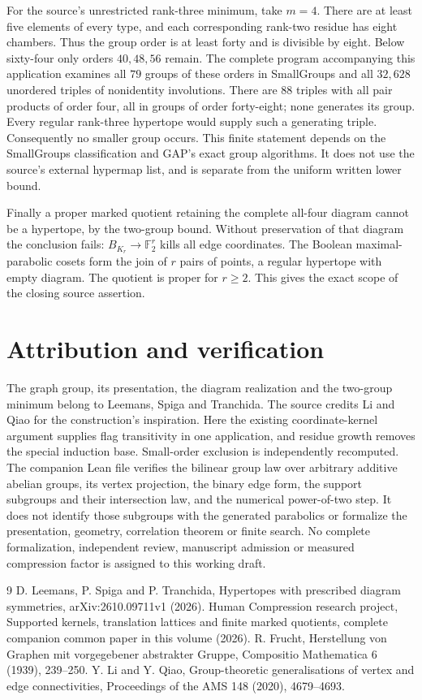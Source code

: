\documentclass[11pt,a4paper]{article}
\newcommand{\F}{\mathbb F_2}
\begin{document}
For the source's unrestricted rank-three minimum, take $m=4$. There are
at least five elements of every type, and each corresponding rank-two
residue has eight chambers. Thus the group order is at least forty and
is divisible by eight. Below sixty-four only orders $40,48,56$ remain.
The complete program accompanying this application examines all $79$ groups
of these orders in SmallGroups and all $32,628$ unordered triples of
nonidentity involutions. There are $88$ triples with all pair products of
order four, all in groups of order forty-eight; none generates its group.
Every regular rank-three hypertope would supply such a generating triple.
Consequently no smaller group occurs. This finite statement depends on
the SmallGroups classification and GAP's exact group algorithms. It does
not use the source's external hypermap list, and is separate from the
uniform written lower bound.

Finally a proper marked quotient retaining the complete all-four diagram
cannot be a hypertope, by the two-group bound. Without preservation of that
diagram the conclusion fails: $B_{K_r}\to\F^r$ kills all edge coordinates.
The Boolean maximal-parabolic cosets form the join of $r$ pairs of points,
a regular hypertope with empty diagram. The quotient is proper for $r\geq2$.
This gives the exact scope of the closing source assertion.
\section*{Attribution and verification}
The graph group, its presentation, the diagram realization and the two-group
minimum belong to Leemans, Spiga and Tranchida. The source credits Li and
Qiao for the construction's inspiration. Here the existing coordinate-kernel
argument supplies flag transitivity in one application, and residue growth
removes the special induction base. Small-order exclusion is independently
recomputed. The companion Lean file verifies the bilinear group law over
arbitrary additive abelian groups, its vertex projection, the binary edge
form, the support subgroups and their intersection law, and the numerical
power-of-two step. It does not identify those subgroups with the generated
parabolics or formalize the presentation, geometry, correlation theorem or
finite search. No complete formalization, independent review, manuscript
admission or measured compression factor is assigned to this working draft.
\begin{thebibliography}{9}
 D. Leemans, P. Spiga and P. Tranchida, Hypertopes with prescribed
diagram symmetries, arXiv:2610.09711v1 (2026).
 Human Compression research project, Supported kernels, translation lattices and finite marked quotients, complete companion common paper in this volume (2026).
 R. Frucht, Herstellung von Graphen mit vorgegebener abstrakter
Gruppe, Compositio Mathematica 6 (1939), 239--250.
 Y. Li and Y. Qiao, Group-theoretic generalisations of vertex and
edge connectivities, Proceedings of the AMS 148 (2020), 4679--4693.
\end{thebibliography}
\end{document}
